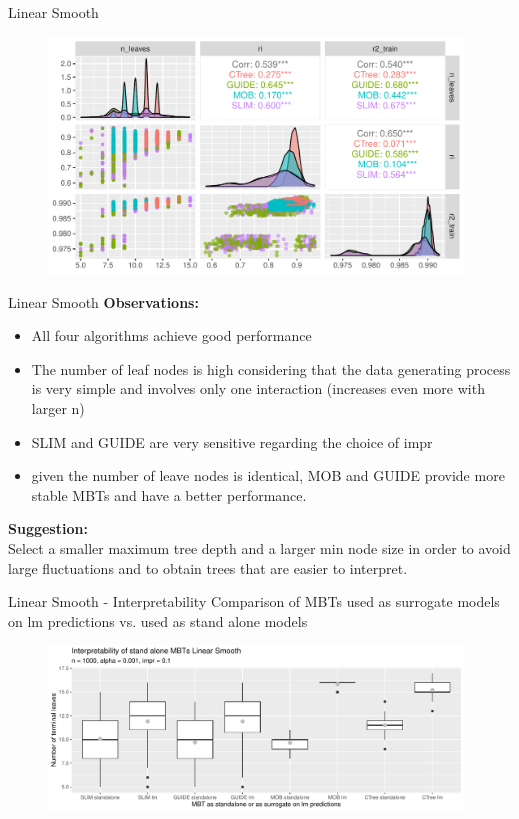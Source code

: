 \documentclass[9pt, xcolor=table]{beamer}
\begin{document}
\begin{frame}{Linear Smooth}
\begin{figure}
    \includegraphics[width=11cm]{Figures/simulations/batchtools/basic_scenarios/linear_smooth/ls_1000_standalone_overview.pdf}
\end{figure}  
    
\end{frame}

\begin{frame}{Linear Smooth}
\textbf{Observations:}
\begin{itemize}
    \item All four algorithms achieve good performance
    \item The number of leaf nodes is high considering that the data generating process is very simple and involves only one interaction (increases even more with larger n)    
    \item SLIM and GUIDE are very sensitive regarding the choice of impr
    \item  given the number of leave nodes is identical, MOB and GUIDE provide more stable MBTs and have a better performance.

\end{itemize}

\textbf{Suggestion:}\\
Select a smaller maximum tree depth and a larger min node size in order to avoid large fluctuations and to obtain trees that are easier to interpret.

    
\end{frame}

\begin{frame}{Linear Smooth - Interpretability}
Comparison of MBTs used as surrogate models on lm predictions vs. used as stand alone models 
\begin{figure}
    \includegraphics[width=11cm]{Figures/simulations/batchtools/basic_scenarios/linear_smooth/ls_1000_standalone_lm_int.pdf}
\end{figure}  
\end{frame}
\end{document}
